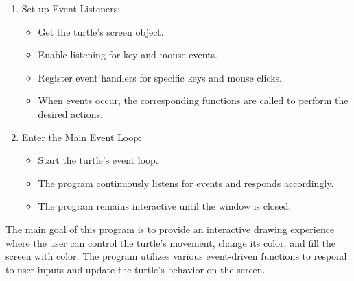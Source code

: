 \documentclass[12pt]{book}
\begin{document}
\begin{enumerate}[label=\arabic*.]
  \item Set up Event Listeners:
    \begin{itemize}
      \item Get the turtle's screen object.
      \item Enable listening for key and mouse events.
      \item Register event handlers for specific keys and mouse clicks.
      \item When events occur, the corresponding functions are called to perform the desired actions.
    \end{itemize}
  
  \item Enter the Main Event Loop:
    \begin{itemize}
      \item Start the turtle's event loop.
      \item The program continuously listens for events and responds accordingly.
      \item The program remains interactive until the window is closed.
    \end{itemize}
\end{enumerate}

The main goal of this program is to provide an interactive drawing experience where the user can control the turtle's movement, change its color, and fill the screen with color. The program utilizes various event-driven functions to respond to user inputs and update the turtle's behavior on the screen.
\end{document}
